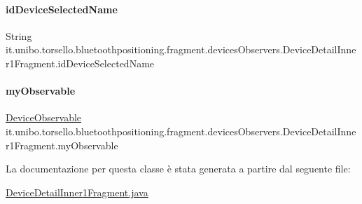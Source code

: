\paragraph{\texorpdfstring{id\+Device\+Selected\+Name}{idDeviceSelectedName}}
{\footnotesize\ttfamily String it.\+unibo.\+torsello.\+bluetoothpositioning.\+fragment.\+devices\+Observers.\+Device\+Detail\+Inner1\+Fragment.\+id\+Device\+Selected\+Name\hspace{0.3cm}{\ttfamily [private]}}

\hypertarget{classit_1_1unibo_1_1torsello_1_1bluetoothpositioning_1_1fragment_1_1devicesObservers_1_1DeviceDetailInner1Fragment_a9d12c9cc89b3d578b42a79cf5fb1abe0_a9d12c9cc89b3d578b42a79cf5fb1abe0}{}\label{classit_1_1unibo_1_1torsello_1_1bluetoothpositioning_1_1fragment_1_1devicesObservers_1_1DeviceDetailInner1Fragment_a9d12c9cc89b3d578b42a79cf5fb1abe0_a9d12c9cc89b3d578b42a79cf5fb1abe0} 
\paragraph{\texorpdfstring{my\+Observable}{myObservable}}
{\footnotesize\ttfamily \hyperlink{classit_1_1unibo_1_1torsello_1_1bluetoothpositioning_1_1observables_1_1DeviceObservable}{Device\+Observable} it.\+unibo.\+torsello.\+bluetoothpositioning.\+fragment.\+devices\+Observers.\+Device\+Detail\+Inner1\+Fragment.\+my\+Observable\hspace{0.3cm}{\ttfamily [private]}}



La documentazione per questa classe è stata generata a partire dal seguente file\+:\begin{DoxyCompactItemize}
\item 
\hyperlink{DeviceDetailInner1Fragment_8java}{Device\+Detail\+Inner1\+Fragment.\+java}\end{DoxyCompactItemize}
